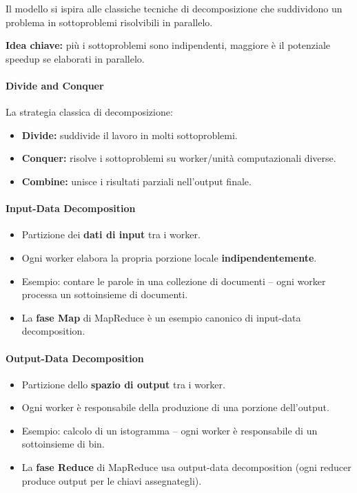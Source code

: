 Il modello si ispira alle classiche tecniche di decomposizione che suddividono
un problema in sottoproblemi risolvibili in parallelo.

\begin{importante}
  \textbf{Idea chiave:} più i sottoproblemi sono indipendenti, maggiore è
  il potenziale speedup se elaborati in parallelo.
\end{importante}

\paragraph{Divide and Conquer}

La strategia classica di decomposizione:
\begin{itemize}
  \item \textbf{Divide:} suddivide il lavoro in molti sottoproblemi.
  \item \textbf{Conquer:} risolve i sottoproblemi su worker/unità computazionali
    diverse.
  \item \textbf{Combine:} unisce i risultati parziali nell'output finale.
\end{itemize}

\paragraph{Input-Data Decomposition}

\begin{itemize}
  \item Partizione dei \textbf{dati di input} tra i worker.
  \item Ogni worker elabora la propria porzione locale \textbf{indipendentemente}.
  \item Esempio: contare le parole in una collezione di documenti -- ogni
    worker processa un sottoinsieme di documenti.
  \item La \textbf{fase Map} di MapReduce è un esempio canonico di
    input-data decomposition.
\end{itemize}

\paragraph{Output-Data Decomposition}

\begin{itemize}
  \item Partizione dello \textbf{spazio di output} tra i worker.
  \item Ogni worker è responsabile della produzione di una porzione dell'output.
  \item Esempio: calcolo di un istogramma -- ogni worker è responsabile di
    un sottoinsieme di bin.
  \item La \textbf{fase Reduce} di MapReduce usa output-data decomposition
    (ogni reducer produce output per le chiavi assegnategli).
\end{itemize}

